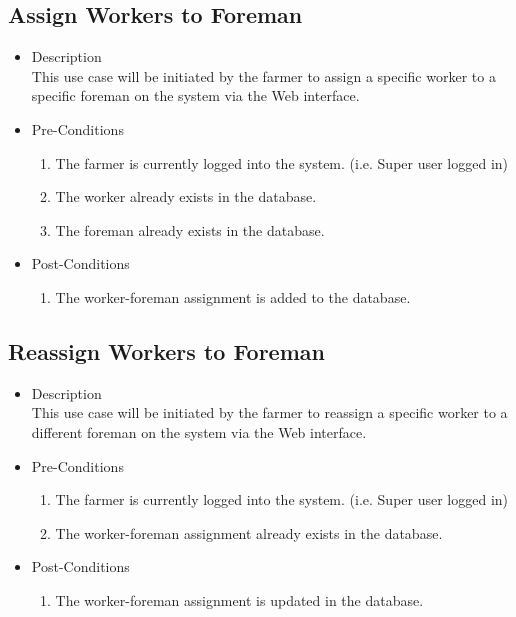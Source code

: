 \documentclass[11pt,fleqn]{book} %
\begin{document}
	\subsection{Assign Workers to Foreman}
	\begin{itemize}
		\item Description\\
		This use case will be initiated by the farmer to assign a specific worker to a specific foreman on the system via the Web interface.
		\item Pre-Conditions
		\begin{enumerate}
			\item The farmer is currently logged into the system. (i.e. Super user logged in)
			\item The worker already exists in the database. 
			\item The foreman already exists in the database. 					
		\end{enumerate}
		\item Post-Conditions
		\begin{enumerate}
			\item The worker-foreman assignment is added to the database.
		\end{enumerate}
	\end{itemize}
	
	\subsection{Reassign Workers to Foreman}
	\begin{itemize}
		\item Description\\
		This use case will be initiated by the farmer to reassign a specific worker to a different foreman on the system via the Web interface.
		\item Pre-Conditions
		\begin{enumerate}
			\item The farmer is currently logged into the system. (i.e. Super user logged in)
			\item The worker-foreman assignment already exists in the database.				
		\end{enumerate}
		\item Post-Conditions
		\begin{enumerate}
			\item The worker-foreman assignment is updated in the database.
		\end{enumerate}
	\end{itemize}
	
\end{document}

